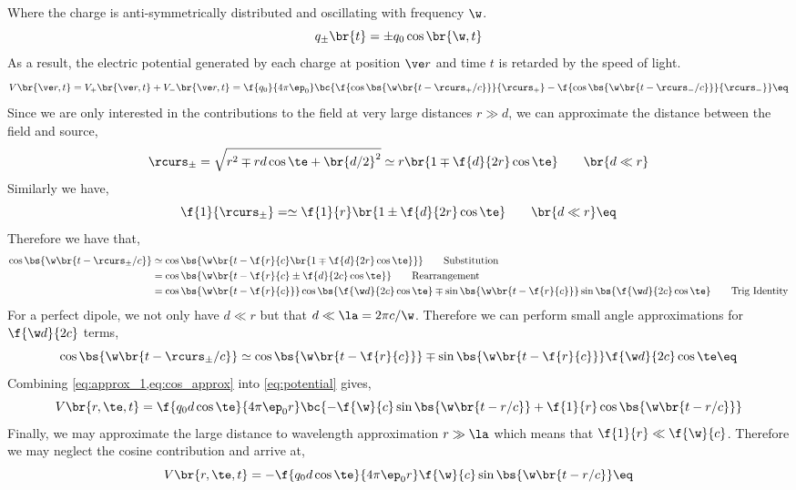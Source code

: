 \documentclass{article}
\begin{document}
Where the charge is anti-symmetrically distributed and oscillating with frequency $\w$.
\[ q_{\pm}\br{t} = \pm q_0 \cos \br{\w, t} \]
As a result, the electric potential generated by each charge at position $\ve r$ and time $t$ is retarded by the speed of light.
\[ V\br{\ve r, t} = V_+\br{\ve r, t} + V_-\br{\ve r, t} = \f{q_0}{4\pi\ep_0} \bc{\f{\cos\bs{\w\br{t- \rcurs_+/c}}}{\rcurs_+} - \f{\cos\bs{\w\br{t- \rcurs_-/c}}}{\rcurs_-}} \eq \label{eq:potential}\]
Since we are only interested in the contributions to the field at very large distances $r \gg d$, we can approximate the distance between the field and source,
\[ \rcurs_{\pm} = \sqrt{r^2 \mp rd\cos\te + \br{d/2}^2} \simeq r\br{1\mp \f{d}{2r}\cos \te} \qquad \br{d \ll r}\]
Similarly we have,
\[ \f{1}{\rcurs_{\pm}} = \simeq \f{1}{r}\br{1\pm \f{d}{2r}\cos \te} \qquad \br{d \ll r} \eq \label{eq:approx_1}\]
Therefore we have that,
\begin{align*}
\cos\bs{\w\br{t - \rcurs_{\pm}/c}}
&\simeq \cos\bs{\w\br{t - \f{r}{c}\br{1\mp \f{d}{2r}\cos \te}}} \qquad {\text{Substitution}}\\
&= \cos\bs{\w\br{t - \f{r}{c} \pm \f{d}{2c}\cos \te}} \qquad {\text{Rearrangement}}\\
&= \cos\bs{\w\br{t - \f{r}{c}}}\cos\bs{\f{\w d}{2c}\cos \te} \mp \sin\bs{\w\br{t - \f{r}{c}}}\sin\bs{\f{\w d}{2c}\cos \te} \qquad {\text{Trig Identity}}
\end{align*}
For a perfect dipole, we not only have $d \ll r$ but that $d \ll \la = 2 \pi c / \w$. Therefore we can perform small angle approximations for $\f{\w d}{2c}$ terms,
\[ \cos\bs{\w\br{t - \rcurs_{\pm}/c}} \simeq \cos\bs{\w\br{t - \f{r}{c}}} \mp \sin\bs{\w\br{t - \f{r}{c}}}\f{\w d}{2c}\cos \te \eq \label{eq:cos_approx}\]
Combining \cref{eq:approx_1,eq:cos_approx} into \cref{eq:potential} gives,
\[ V\br{r, \te, t} = \f{q_0 d \cos \te}{4\pi \ep_0 r} \bc{- \f{\w}{c} \sin\bs{\w\br{t - r/c}} + \f{1}{r}\cos\bs{\w\br{t - r/c}}} \]
Finally, we may approximate the large distance to wavelength approximation $r \gg \la$ which means that $\f{1}{r} \ll \f{\w}{c}$. Therefore we may neglect the cosine contribution and arrive at,
\[ V\br{r, \te, t} = -\f{q_0 d \cos \te}{4\pi \ep_0 r}\f{\w}{c} \sin\bs{\w\br{t - r/c}} \eq \label{eq:V}\]
\end{document}
